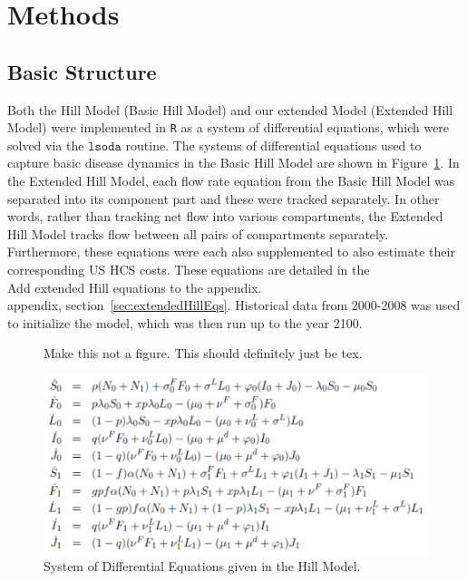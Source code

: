 \documentclass{amsart}
\begin{document}
\section{Methods}
\subsection{Basic Structure}
Both the Hill Model (Basic Hill Model) and our extended Model (Extended Hill
Model) were implemented in \texttt{R} as a system of differential equations,
which were solved via the $\texttt{lsoda}$ routine. The systems of differential
equations used to capture basic disease dynamics in the Basic Hill Model are
shown in Figure~\ref{fig:hillEquations}.  In the Extended Hill Model, each flow
rate equation from the Basic Hill Model was separated into its component part
and these were tracked separately. In other words, rather than tracking net flow
into various compartments, the Extended Hill Model tracks flow between all pairs
of compartments separately. Furthermore, these equations were each also supplemented to
also estimate their corresponding US HCS costs.  These equations are detailed in
the\\
{\huge\color{red} Add extended Hill equations to the appendix.}\\
appendix,
section~\ref{sec:extendedHillEqs}.  Historical data from 2000-2008 was used to
initialize the model, which was then run up to the year 2100.  

\begin{figure} 
  {\huge\color{red} Make this not a figure. This should definitely just be tex.}
  \begin{center}
    \includegraphics[scale=0.75]{figures/BasicHillEquations.pdf}
  \end{center}
  \caption{System of Differential Equations given in the Hill Model.}
  \label{fig:hillEquations}
\end{figure}
\end{document}

